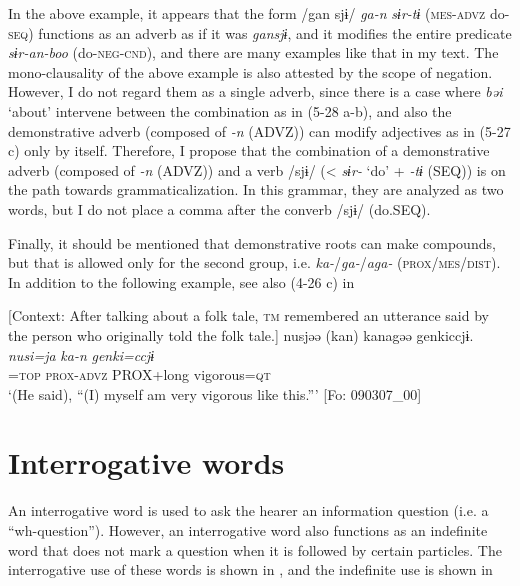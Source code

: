 In the above example, it appears that the form /gan sjɨ/ \textit{ga-n} \textit{sɨr-tɨ} (\textsc{mes}-\textsc{advz} do-\textsc{seq}) functions as an adverb as if it was \textit{gansjɨ}, and it modifies the entire predicate \textit{sɨr-an-boo} (do-\textsc{neg}-\textsc{cnd}), and there are many examples like that in my text. The mono-clausality of the above example is also attested by the scope of negation. However, I do not regard them as a single adverb, since there is a case where \textit{bəi} ‘about’ intervene between the combination as in (5-28 a-b), and also the demonstrative adverb (composed of \textit{{}-n} (ADVZ)) can modify adjectives as in (5-27 c) only by itself. Therefore, I propose that the combination of a demonstrative adverb (composed of \textit{{}-n} (ADVZ)) and a verb /sjɨ/ (< \textit{sɨr-} ‘do’ + \textit{{}-tɨ} (SEQ)) is on the path towards grammaticalization. In this grammar, they are analyzed as two words, but I do not place a comma after the converb /sjɨ/ (do.SEQ).

  Finally, it should be mentioned that demonstrative roots can make compounds, but that is allowed only for the second group, i.e. \textit{ka-}/\textit{ga-}/\textit{aga-} (\textsc{prox}/\textsc{mes}/\textsc{dist}). In addition to the following example, see also (4-26 c) in 

\ea \label{ex:5:30}   [Context: After talking about a folk tale, \textsc{tm} remembered an utterance said by the person who originally told the folk tale.]
\glll  nusjəə  (kan)  kanagəə  {\textbar}genki{\textbar}ccjɨ.\\
\textit{nusi=ja}  \textit{ka-n}  \textit{}  \textit{genki=ccjɨ}\\
\REF=\textsc{top}  \textsc{prox}-\textsc{advz}  PROX+long  vigorous=\textsc{qt}\\
\glt ‘(He said), “(I) myself am very vigorous like this.”’ [Fo: 090307\_00]
\z

\section{Interrogative words}
\label{sec:key:5.3}
An interrogative word is used to ask the hearer an information question (i.e. a “wh-question”). However, an interrogative word also functions as an indefinite word that does not mark a question when it is followed by certain particles. The interrogative use of these words is shown in , and the indefinite use is shown in 


